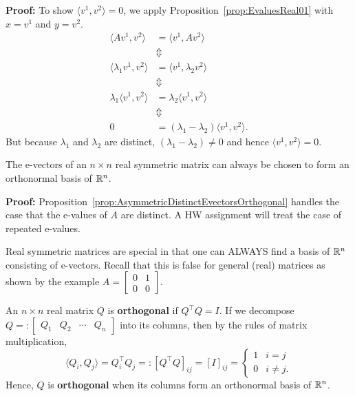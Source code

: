 \textbf{Proof:} To show $\langle v^1, v^2 \rangle=0$, we apply Proposition~\ref{prop:EvaluesReal01} with $x=v^1$ and $y=v^2$.
\begin{align*}
     \langle Av^1, v^2 \rangle & =  \langle v^1, Av^2 \rangle \\
     & \Updownarrow \\
     \langle \lambda_1 v^1, v^2 \rangle & =  \langle v^1, \lambda_2 v^2 \rangle \\
     & \Updownarrow \\
     \lambda_1 \langle v^1, v^2 \rangle & =  \lambda_2 \langle v^1, v^2 \rangle \\
     & \Updownarrow \\
      0 & =  (\lambda_1 - \lambda_2) \langle v^1, v^2 \rangle.
     \end{align*}
      But because $\lambda_1$ and $\lambda_2$ are distinct, $ (\lambda_1 - \lambda_2) \neq 0$ and hence $\langle v^1, v^2 \rangle=0$.
\Qed

\begin{prop} 
\label{prop:AsymmetricBasisOrthonormalEvectors}
The e-vectors of an $n \times n$ real symmetric matrix can always be chosen to form an orthonormal basis of $\mathbb R^n$. 
\end{prop}

\textbf{Proof:} Proposition~\ref{prop:AsymmetricDistinctEvectorsOrthogonal} handles the case that the e-values of $A$ are distinct. A HW assignment will treat the case of repeated e-values. 

\Qed

\begin{rem}
Real symmetric matrices are special in that one can ALWAYS find a basis of $\mathbb R^n$ consisting of e-vectors. Recall that this is false for general (real) matrices as shown by the example $A=\begin{bmatrix} 0 & 1 \\ 0& 0 \end{bmatrix}.$
\end{rem}

\begin{definition} An $n \times n$ real matrix $Q$ is \textbf{orthogonal} if $Q^\top Q=I$. If we decompose $Q=:\begin{bmatrix}Q_1 & Q_2 & \cdots & Q_n \end{bmatrix}$ into its columns, then by the rules of matrix multiplication, 
$$ \langle Q_i, Q_j \rangle =  Q_i^\top Q_j =:[Q^\top Q]_{ij} =  [I]_{ij}= \begin{cases} 1 & i = j\\ 0 & i \neq j. \end{cases} $$
Hence, $Q$ is \textbf{orthogonal} when its columns form an orthonormal basis of $\mathbb R^n$.
\end{definition}

